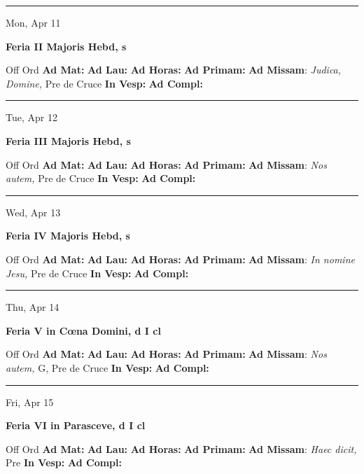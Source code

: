 \documentclass[letterpaper, 10pt]{article}
\begin{document}
\hrule
\begin{center}
Mon, Apr 11
\end{center}\textbf{ \large Feria II Majoris Hebd, \textnormal{\normalsize s}}
\begin{justify}
Off Ord
\textbf{Ad Mat: }
\textbf{Ad Lau: }
\textbf{Ad Horas: }
\textbf{Ad Primam: }
\textbf{Ad Missam}: \textit{Judica, Domine,} Pre de Cruce
\textbf{In Vesp: }
\textbf{Ad Compl: }\end{justify}



\hrule
\begin{center}
Tue, Apr 12
\end{center}\textbf{ \large Feria III Majoris Hebd, \textnormal{\normalsize s}}
\begin{justify}
Off Ord
\textbf{Ad Mat: }
\textbf{Ad Lau: }
\textbf{Ad Horas: }
\textbf{Ad Primam: }
\textbf{Ad Missam}: \textit{Nos autem,} Pre de Cruce
\textbf{In Vesp: }
\textbf{Ad Compl: }\end{justify}



\hrule
\begin{center}
Wed, Apr 13
\end{center}\textbf{ \large Feria IV Majoris Hebd, \textnormal{\normalsize s}}
\begin{justify}
Off Ord
\textbf{Ad Mat: }
\textbf{Ad Lau: }
\textbf{Ad Horas: }
\textbf{Ad Primam: }
\textbf{Ad Missam}: \textit{In nomine Jesu,} Pre de Cruce
\textbf{In Vesp: }
\textbf{Ad Compl: }\end{justify}



\hrule
\begin{center}
Thu, Apr 14
\end{center}\textbf{ \large Feria V in Cœna Domini, \textnormal{\normalsize d I cl}}
\begin{justify}
Off Ord
\textbf{Ad Mat: }
\textbf{Ad Lau: }
\textbf{Ad Horas: }
\textbf{Ad Primam: }
\textbf{Ad Missam}: \textit{Nos autem,} G, Pre de Cruce
\textbf{In Vesp: }
\textbf{Ad Compl: }\end{justify}



\hrule
\begin{center}
Fri, Apr 15
\end{center}\textbf{ \large Feria VI in Parasceve, \textnormal{\normalsize d I cl}}
\begin{justify}
Off Ord
\textbf{Ad Mat: }
\textbf{Ad Lau: }
\textbf{Ad Horas: }
\textbf{Ad Primam: }
\textbf{Ad Missam}: \textit{Haec dicit,} Pre 
\textbf{In Vesp: }
\textbf{Ad Compl: }\end{justify}
\end{document}
